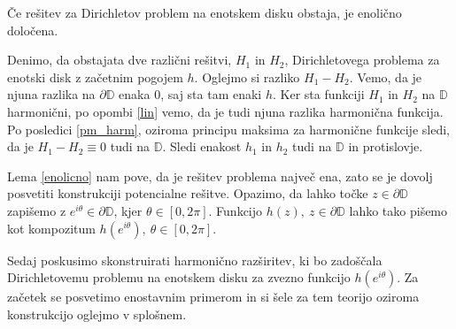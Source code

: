 \documentclass[mat1, tisk]{fmfdelo}
\begin{document}
    \begin{lema}
        \label{enolicno}
        Če rešitev za Dirichletov problem na enotskem disku obstaja, je enolično določena.
    \end{lema}
    \begin{dokaz}
        Denimo, da obstajata dve različni rešitvi, $H_1$ in $H_2$, Dirichletovega problema za enotski disk z začetnim pogojem $h$.
        Oglejmo si razliko $H_1 - H_2$. Vemo, da je njuna razlika na $\partial \mathbb{D}$ enaka $0$, saj sta tam enaki $h$. Ker sta funkciji $H_1$ in $H_2$ na $\mathbb{D}$ harmonični, po opombi \ref{lin} vemo, da je tudi njuna razlika harmonična funkcija. 
        Po posledici \ref{pm_harm}, oziroma principu maksima za harmonične funkcije sledi, da je $H_1 - H_2 \equiv 0$ tudi na $\mathbb{D}$. Sledi enakost $h_1$ in $h_2$ tudi na $\mathbb{D}$ in protislovje. 
    \end{dokaz}
    
    \begin{opomba}
        \label{opomba_dir}
        Lema \ref{enolicno} nam pove, da je rešitev problema največ ena, zato se je dovolj posvetiti konstrukciji potencialne rešitve. 
        Opazimo, da lahko točke $z \in \partial \mathbb{D}$ zapišemo z $e^{i \theta} \in \partial \mathbb{D}$, kjer $\theta \in [0,2\pi]$. Funkcijo $h(z),~z \in \partial \mathbb{D}$ lahko tako pišemo kot kompozitum $h(e^{i \theta}),~\theta \in [0,2\pi]$.
    \end{opomba}

    Sedaj poskusimo skonstruirati harmonično razširitev, ki bo zadoščala Dirichletovemu problemu na enotskem disku za zvezno funkcijo $h(e^{i \theta})$.
    Za začetek se posvetimo enostavnim primerom in si šele za tem teorijo oziroma konstrukcijo oglejmo v splošnem. 
    
\end{document}
